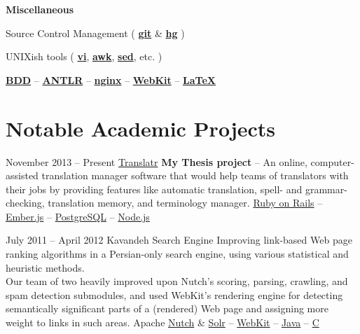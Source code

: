 \documentclass{tccv}
\newcommand{\plus}{\raisebox{.1\height}{\scalebox{.8}{+}}}
\begin{document}
{{\vspace{9pt}%
\hspace{-1pt}%
\textsf{\textbf{Miscellaneous}}

\hspace{2pt}%
Source Control Management (%
	\href{http://git-scm.com}{\bf git} \& %
	\href{http://www.selenic.com/mercurial/}{\bf hg}%
)%

\hspace{2pt}%
UNIXish tools (%
	\href{http://www.vim.org}{\bf vi}, %
	\href{http://awk.info}{\bf awk}, %
	\href{http://www.gnu.org/software/sed/}{\bf sed}, etc.%
)%

\hspace{2pt}%
	\href{http://en.wikipedia.org/wiki/Behavior-driven_development}{\bf BDD} -- %
	\href{http://www.antlr.org}{\bf ANTLR} -- %
	\href{http://nginx.org/en/}{\bf nginx} -- %
	\href{http://www.webkit.org}{\bf WebKit} -- %
	\href{http://www.latex-project.org}{\bf \LaTeX}




\newpage





\section{Notable Academic Projects}

\begin{project_list}

\vspace{7pt}

\item{November 2013 -- Present}
     {}
     {\vspace{-14pt}\href{https://github.com/pooriaazimi/Translatr}{Translatr}}
	 {{\bf My Thesis project} -- An online, computer-assisted \mbox{translation} manager software that would help teams of translators with their jobs by providing features like auto\-matic translation, spell- and grammar-checking, translation memory, and terminology manager.}
     {%
     	\href{http://rubyonrails.org}{Ruby on Rails} -- %
		\href{http://emberjs.com}{Ember.js} -- %
		\href{http://www.postgresql.org}{PostgreSQL} -- %
		\href{http://nodejs.org}{Node.js}%
	}
		
	
\vspace{-6pt}

\item{July 2011 -- April 2012}
     {}
     {Kavandeh Search Engine}
	 {Improving link-based Web page ranking algorithms in a Persian-only search engine, using various statistical and heuristic methods.
	 \\[1.5pt]
	 Our team of two heavily improved upon Nutch's \mbox{scoring}, parsing, crawling, and spam detection submodules, and used WebKit's rendering engine for detecting \mbox{semantically} significant parts of a (rendered) Web page and \mbox{assigning} more weight to links in such areas.}
     {%
     	Apache \href{http://nutch.apache.org}{Nutch} \&
		\href{http://lucene.apache.org/solr/}{Solr} -- %
		\href{http://www.webkit.org}{WebKit} -- %
		\href{http://www.oracle.com/technetwork/java/}{Java} -- %
		\href{https://en.wikipedia.org/wiki/C\%2B\%2B}{C\plus\plus}%
	}


\end{project_list}}}
\end{document}
